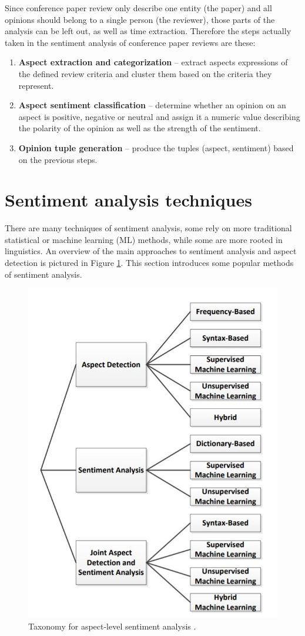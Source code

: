  Since conference paper review only describe one entity (the paper) and all opinions should belong to a single person (the reviewer), those parts of the analysis can be left out, as well as time extraction. Therefore the steps actually taken in the sentiment analysis of conference paper reviews are these:
 \begin{enumerate}
    \item \textbf{Aspect extraction and categorization} -- extract aspects expressions of the defined review criteria and cluster them based on the criteria they represent.
    \item \textbf{Aspect sentiment classification} -- determine whether an opinion on an aspect is positive, negative or neutral and assign it a numeric value describing the polarity of the opinion as well as the strength of the sentiment.
    \item \textbf{Opinion tuple generation} -- produce the tuples (aspect, sentiment) based on the previous steps.
    \end{enumerate}
\section{Sentiment analysis techniques}
There are many techniques of sentiment analysis, some rely on more traditional statistical or machine learning (ML) methods, while some are more rooted in linguistics. An overview of the main approaches to sentiment analysis and aspect detection is pictured in Figure \ref{img01:taxOM}. This section introduces some popular methods of sentiment analysis.
\begin{figure}[htbp!]\centering
\includegraphics[width=.66\textwidth]{img/taxonomy_om}
      \caption[Taxonomy for aspect-level sentiment analysis]{Taxonomy for aspect-level sentiment analysis \cite{schouten_2016}.}\label{img01:taxOM}
    \end{figure}

